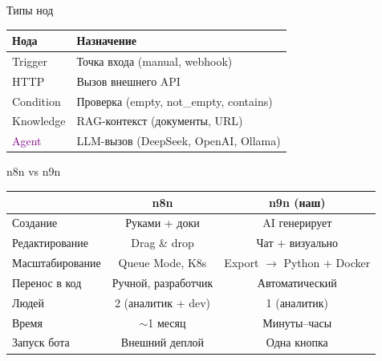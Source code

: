 \documentclass[aspectratio=169, 12pt]{beamer}
\begin{document}
\begin{frame}{Типы нод}
\centering
{}

\vspace{0.4cm}
\small
\begin{tabular}{ll}
\toprule
\textbf{Нода} & \textbf{Назначение} \\
\midrule
\textcolor{accent}{Trigger} & Точка входа (manual, webhook) \\
\textcolor{warn}{HTTP} & Вызов внешнего API \\
\textcolor{danger}{Condition} & Проверка (empty, not\_empty, contains) \\
\textcolor{ok}{Knowledge} & RAG-контекст (документы, URL) \\
\textcolor{purple}{Agent} & LLM-вызов (DeepSeek, OpenAI, Ollama) \\
\bottomrule
\end{tabular}
\end{frame}

\begin{frame}{n8n vs n9n}
\centering
\renewcommand{\arraystretch}{1.4}
\small
\begin{tabular}{l c c}
\toprule
& \textbf{n8n} & \textbf{n9n (наш)} \\
\midrule
Создание & Руками + доки & AI генерирует \\
Редактирование & Drag \& drop & Чат + визуально \\
Масштабирование & Queue Mode, K8s & Export $\rightarrow$ Python + Docker \\
Перенос в код & Ручной, разработчик & Автоматический \\
Людей & 2 (аналитик + dev) & 1 (аналитик) \\
Время & $\sim$1 месяц & Минуты--часы \\
Запуск бота & Внешний деплой & Одна кнопка \\
\bottomrule
\end{tabular}
\end{frame}
\end{document}
